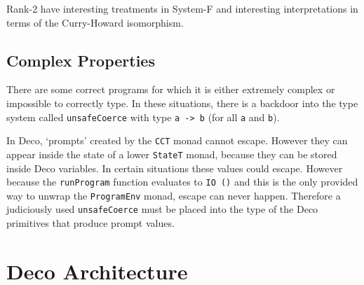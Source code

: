 \documentclass[]{article}
\newcommand{\function}[1]{\texttt{#1}}
\newcommand{\type}[1]{\texttt{#1}}
\begin{document}
Rank-2 have interesting treatments in System-F and interesting interpretations
in terms of the Curry-Howard isomorphism.

\subsection{Complex Properties}
\label{discussion:unsafecast}

There are some correct programs for which it is either extremely
complex or impossible to correctly type. In these situations,
there is a backdoor into the type system called \function{unsafeCoerce}
with type \type{a -> b} (for all \type{a} and \type{b}).

In Deco, `prompts' created by the \type{CCT} monad cannot escape. However they
can appear inside the state of a lower \type{StateT} monad, because they can
be stored inside Deco variables. In certain situations these values could
escape. However because the \function{runProgram} function evaluates to
\type{IO ()} and this is the only provided way to unwrap the \type{ProgramEnv}
monad, escape can never happen. Therefore a judiciously used
\function{unsafeCoerce} must be placed into the type of the Deco primitives
that produce prompt values.

\section{Deco Architecture}





\end{document}
